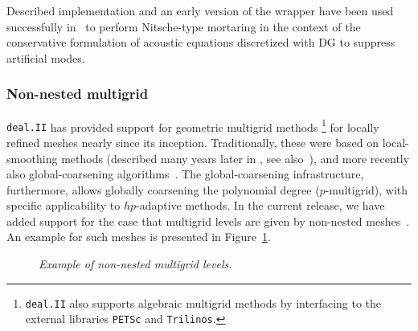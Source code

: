 \documentclass{ansarticle-preprint}
\newcommand{\specialword}[1]{\texttt{#1}}
\newcommand{\dealii}{{\specialword{deal.II}}\xspace}
\begin{document}
Described implementation and an early version of the wrapper have been used successfully in~\cite{heinz2023high} to perform Nitsche-type mortaring in the context of the conservative formulation of acoustic equations discretized with DG to suppress artificial modes.
\subsubsection{Non-nested multigrid}

\dealii has provided support for geometric multigrid methods%
\footnote{\dealii{} also supports algebraic multigrid methods
by interfacing to the external libraries \texttt{PETSc}
and \texttt{Trilinos}.}
for locally refined meshes nearly since its inception.
Traditionally, these were based on local-smoothing
methods (described many years later in \cite{Kanschat2004,JanssenKanschat2011}, see
also~\cite{ClevengerHeisterKanschatKronbichler2019}), and more
recently also global-coarsening algorithms~\cite{munch2022gc}. The global-coarsening
infrastructure, furthermore, allows globally coarsening the polynomial degree ($p$-multigrid),
with specific applicability to $hp$-adaptive methods.
In the current release, we have added support for the case
that multigrid levels are given by non-nested meshes~\cite{adams2002evaluation, bittencourt2001nonnested, bramble1991analysis}. An example for such meshes is
presented in Figure~\ref{fig:nonnested}.

\begin{figure}

\centering



\caption{\it Example of non-nested multigrid levels.}\label{fig:nonnested}

\end{figure}
\end{document}
